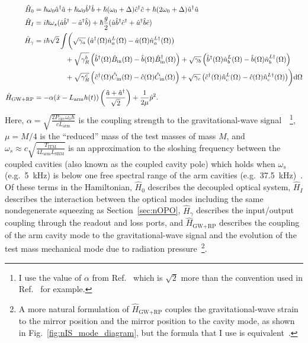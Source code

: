 \begin{align}\label{eq:nIS_Hamiltonian}
\hat H_0 &= \hbar \omega_0 \hat a^\dag \hat a + \hbar \omega_0 \hat b^\dag \hat b+ \hbar (\omega_0+\Delta) \hat c^\dag \hat c + \hbar (2\omega_0+\Delta) \hat u^\dag \hat u\\
\hat H_I &= i\hbar\omega_s(\hat a\hat b^\dag-\hat a^\dag\hat b) + \hbar \frac{g}{2} (\hat u \hat b^\dag \hat c^\dag+\hat u^\dag \hat b \hat c) \nonumber\\
\hat H_\gamma &= i\hbar \sqrt{2}\int \biggl( \sqrt{\gamma_a}\left(\hat{a}^\dag(\Omega)\hat n^L_a(\Omega)-\hat{a}(\Omega)\hat{n}^{L\dag}_a(\Omega)\right) \nonumber\\
& \hspace*{1.55cm} + \sqrt{\gamma^b_R}\left(\hat{b}^\dag(\Omega)\hat{B}_\text{in}(\Omega)-\hat{b}(\Omega)\hat{B}_\text{in}^\dag(\Omega)\right) + \sqrt{\gamma_b}\left(\hat{b}^\dag(\Omega)\hat n^L_b(\Omega)-\hat{b}(\Omega)\hat{n}^{L\dag}_b(\Omega)\right) \nonumber \\
& \hspace*{1.55cm} + \sqrt{\gamma^c_R}\left(\hat{c}^\dag(\Omega)\hat C_\text{in}(\Omega)-\hat{c}(\Omega)\hat C_\text{in}(\Omega)\right) + \sqrt{\gamma_c}\left(\hat{c}^\dag(\Omega)\hat n^L_c(\Omega)-\hat{c}(\Omega)\hat{n}^{L\dag}_c(\Omega)\right)\biggr)\text{d}\Omega \nonumber\\
\hat H_\text{GW+RP} &= -\alpha (\hat{x}-L_\mathrm{arm}h(t))\left(\frac{\hat{a}+\hat{a}^\dag}{\sqrt{2}}\right)+\frac{1}{2\mu}\hat{p}^2.\nonumber
\end{align}
Here, $\alpha=\sqrt{\frac{2 P_\text{circ} \omega_0 \hbar}{c  L_\text{arm}}}$ is the coupling strength to the gravitational-wave signal~\cite{liBroadbandSensitivityImprovement2020}~\footnote{I use the value of $\alpha$ from Ref.~\cite{liBroadbandSensitivityImprovement2020} which is $\sqrt2$ more than the convention used in Ref.~\cite{korobkoQuantumExpanderGravitationalwave2019} for example.}, $\mu=M/4$ is the ``reduced'' mass of the test masses of mass $M$, and $\omega_s\approx c\sqrt{\frac{T_\text{ITM}}{4 L_\text{arm} L_\text{SRM}}}$ is an approximation to the sloshing frequency between the coupled cavities (also known as the coupled cavity pole) which holds when $\omega_s$ (e.g.\ 5~kHz) is below one free spectral range of the arm cavities (e.g.\ 37.5~kHz)~\cite{korobkoQuantumExpanderGravitationalwave2019}.
Of these terms in the Hamiltonian, $\hat H_0$ describes the decoupled optical system, $\hat H_I$ describes the interaction between the optical modes including the same nondegenerate squeezing as Section~\ref{sec:nOPO}, $\hat H_\gamma$ describes the input/output coupling through the readout and loss ports, and $\hat H_\text{GW+RP}$ describes the coupling of the arm cavity mode to the gravitational-wave signal and the evolution of the test mass mechanical mode due to radiation pressure~\footnote{A more natural formulation of $\hat H_\text{GW+RP}$ couples the gravitational-wave strain to the mirror position and the mirror position to the cavity mode, as shown in Fig.~\ref{fig:nIS_mode_diagram}, but the formula that I use is equivalent~\cite{bowen2015quantum}.}.

